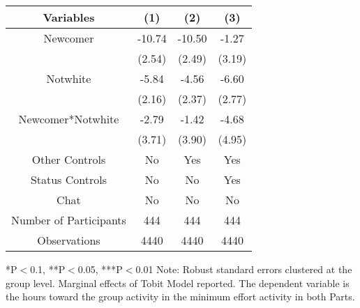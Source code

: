 \begin{table}[htbp]
    \begin{tabular}{c c c c}
    \toprule
    \textbf{Variables} & \textbf{(1)} & \textbf{(2)} & \textbf{(3)}     \\ 
\midrule
Newcomer                         &     -10.74\sym{***} &     -10.50\sym{***}  &  -1.27       \\
                                 &     (2.54)          &     (2.49)          &  (3.19)             \\
Notwhite                         &  -5.84\sym{***} &     -4.56\sym{*}  &  -6.60\sym{**}   \\
                                 &     (2.16)          &     (2.37)          &  (2.77)             \\
Newcomer*Notwhite              &     -2.79              &     -1.42   &  -4.68   \\
                                 &     (3.71)          &     (3.90)          &  (4.95)             \\


\midrule
Other Controls                   &    No               &    Yes              &    Yes            \\
Status Controls                    &    No               &    No               &    Yes           \\
Chat                             &    No               &    No               &    No             \\
\midrule
Number of Participants           &    444               &    444              &    444               \\
\midrule
Observations                     &       4440          &       4440          &  4440            \\
\bottomrule

\end{tabular}
\begin{footnotesize}
\newline
*P$<$0.1, **P$<$0.05, ***P$<$0.01
\newline
Note: Robust standard errors clustered at the group level. Marginal effects of Tobit Model reported. 
\newline
The dependent variable is the hours toward the group activity in the minimum effort activity in both Parts. 
\end{footnotesize}
\end{table}
